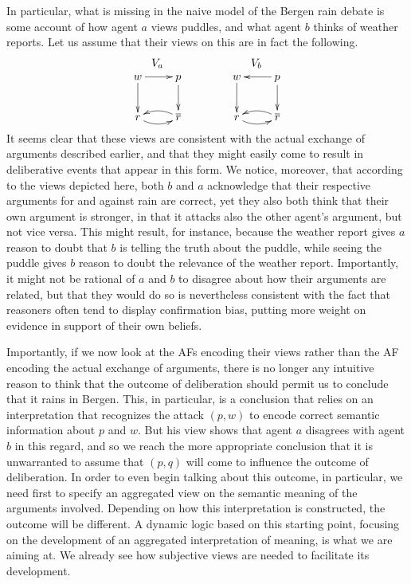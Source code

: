 \documentclass[greybox]{svmult}
\renewcommand{\bar}[1]{\overline{#1}}
\begin{document}
\begin{example}
In particular, what is missing in the naive model of the Bergen rain debate is some account of how agent $a$ views puddles, and what agent $b$ thinks of weather reports. Let us assume that their views on this are in fact the following.
$$
\begin{array}{cc}
V_{a} \hspace{3em} & V_{b} \\
\xymatrix{ w \ar[d] \ar[r] & p \ar[d] \\ r \ar@/_/[r] & \bar r \ar@/_/[l] } \hspace{3em} &
\xymatrix{w \ar[d] & p \ar[d] \ar[l] \\ r \ar@/_/[r] & \bar r \ar@/_/[l] }
\end{array}
$$
It seems clear that these views are consistent with the actual exchange of arguments described earlier, and that they might easily come to result in deliberative events that appear in this form. We notice, moreover, that according to the views depicted here, both $b$ and $a$ acknowledge that their respective arguments for and against rain are correct, yet they also both think that their own argument is stronger, in that it attacks also the other agent's argument, but not vice versa. This might result, for instance, because the weather report gives $a$ reason to doubt that $b$ is telling the truth about the puddle, while seeing the puddle gives $b$ reason to doubt the relevance of the weather report. Importantly, it might not be rational of $a$ and $b$ to disagree about how their arguments are related, but that they would do so is nevertheless consistent with the fact that reasoners often tend to display confirmation bias, putting more weight on evidence in support of their own beliefs.

Importantly, if we now look at the AFs encoding their views rather than the AF encoding the actual exchange of arguments, there is no longer any intuitive reason to think that the outcome of deliberation should permit us to conclude that it rains in Bergen. This, in particular, is a conclusion that relies on an interpretation that recognizes the attack $(p,w)$ to encode correct semantic information about $p$ and $w$. But his view shows that agent $a$ disagrees with agent $b$ in this regard, and so we reach the more appropriate conclusion that it is unwarranted to assume that $(p,q)$ will come to influence the outcome of deliberation. In order to even begin talking about this outcome, in particular, we need first to specify an aggregated view on the semantic meaning of the arguments involved. Depending on how this interpretation is constructed, the outcome will be different. A dynamic logic based on this starting point, focusing on the development of an aggregated interpretation of meaning, is what we are aiming at. We already see how subjective views are needed to facilitate its development.
\end{example}
\end{document}
